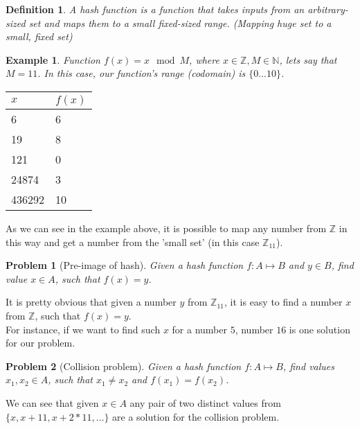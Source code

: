 \documentclass[letterpaper, bothsides, 12pt]{article} %
\newtheorem{definition}{Definition}
\newtheorem{example}{Example}
\newtheorem{problem}{Problem}
\begin{document}
\begin{definition}
A hash function is a function that takes inputs from an arbitrary-sized set and maps them to a small fixed-sized range. (Mapping huge set to a small, fixed set)
\end{definition}


\begin{example}
Function $f(x) = x \mod M$, where $x \in \mathbb{Z}, M \in \mathbb{N}$, lets say that $M = 11$. In this case, our function's range (codomain) is $\{ 0 \dots 10 \}$.
\\
\end{example}

\begin{table}[]
\centering
\begin{tabular}{ll}
 $x$ & $f(x)$ \\ [0.5ex] 
 \hline
6 &  6\\
19 &  8 \\
121 & 0 \\
24874 & 3  \\
436292 & 10  \\

\end{tabular}
\end{table}
As we can see in the example above, it is possible to map any number from $\mathbb{Z}$ in this way and get a number from the 'small set' (in this case $\mathbb{Z}_{11}$). \\ 

\begin{problem}[Pre-image of hash]
Given a hash function $f\colon A \mapsto B$ and $y \in B$, find value $x \in A$, such that $f(x) = y$.
\end{problem}

It is pretty obvious that given a number $y$ from $\mathbb{Z}_{11}$, it is easy to find a number $x$ from $\mathbb{Z}$, such that $f(x) = y$. \\
For instance, if we want to find such $x$ for a number $5$, number $16$ is one solution for our problem.

\begin{problem}[Collision problem]
Given a hash function $f\colon A \mapsto B$, find values $x_1, x_2 \in A$, such that $x_1 \neq x_2$ and $f(x_1) = f(x_2)$.
\end{problem}

We can see that given $x \in A$ any pair of two distinct values from $ \{x, x + 11, x + 2 * 11, \dots \}$ are a solution for the collision problem. \\
\end{document}
